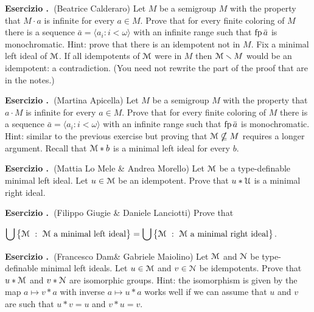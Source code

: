 \documentclass[10pt]{article}
\def\M{\EuScript M}
\def\N{\EuScript N}
\def\U{\EuScript U}
\def\sm{\smallsetminus}
\def\fp{{\rm fp}}
\newcounter{ex}
\newenvironment{exercise}{\bigskip\addtocounter{ex}{1}\textbf{Esercizio \theex.\ }}{}
\begin{document}
\begin{exercise}(Beatrice Calderaro)
  Let $M$ be a semigroup $M$ with the property that $M\cdot a$ is infinite for every $a\in M$.
  Prove that for every finite coloring of $M$ there is a sequence $\bar a=\langle a_i:i<\omega\rangle$ with an infinite range such that $\fp\,\bar a$ is monochromatic.
  Hint: prove that there is an idempotent not in $M$. Fix a minimal left ideal of $\M$. If all idempotents of $\M$ were in $M$ then $\M\sm M$ would be an idempotent: a contradiction.
  (You need not rewrite the part of the proof that are in the notes.)
\end{exercise}

\begin{exercise}(Martina Apicella)
  Let $M$ be a semigroup $M$ with the property that $a\cdot M$ is infinite for every $a\in M$.
  Prove that for every finite coloring of $M$ there is a sequence $\bar a=\langle a_i:i<\omega\rangle$ with an infinite range such that $\fp\,\bar a$ is monochromatic.
  Hint: similar to the previous exercise but proving that $\M\not\nsubseteq M$ requires a longer argument. Recall that $\M*b$ is a minimal left ideal for every $b$.
\end{exercise}

\begin{exercise}(Mattia Lo Mele \& Andrea Morello)
  Let $\M$ be a type-definable minimal left ideal.
  Let $u\in\M$ be an idempotent.
  Prove that $u*\U$ is a minimal right ideal.
\end{exercise}

\begin{exercise}(Filippo Giugie \& Daniele Lanciotti)
Prove that 

 \hfil$\displaystyle\bigcup\big\{\M\ :\ \M\text{ a minimal left ideal}\big\} =\bigcup\big\{\M\ :\ \M\text{ a minimal right ideal}\big\}$.

\end{exercise}

\begin{exercise}(Francesco Dam\&	Gabriele Maiolino)
  Let $\M$ and $\N$ be type-definable minimal left ideals.
  Let $u\in\M$ and $v\in\N$ be idempotents.
  Prove that $u*\M$ and $v*\N$ are isomorphic groups.
  Hint: the isomorphism is given by the map $a\mapsto v*a$ with inverse $a\mapsto u*a$ works well if we can assume that $u$ and $v$ are such that $u*v=u$ and $v*u=v$.
\end{exercise}
\end{document}
